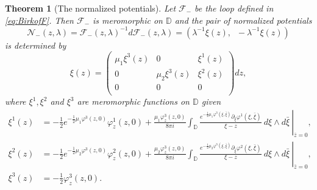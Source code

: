 \documentclass[12pt]{amsart}
\newtheorem{Theorem}{Theorem}[section]
\theoremstyle{definition}
\theoremstyle{remark}
\numberwithin{equation}{section}
\begin{document}
\begin{Theorem}[The normalized potentials]
 Let ${\mathcal F}_{-}$ be the loop defined in \eqref{eq:BirkofF}.
 Then ${\mathcal F}_{-}$ is meromorphic on ${\mathbb D}$ and the pair of normalized potentials 
\begin{equation*}
 {\mathcal N}_{-}(z, {\lambda}) = {\mathcal F}_{-}(z, {\lambda})^{-1} d {\mathcal F}_{-}(z, {\lambda}) 
 = \left({\lambda}^{-1}\xi(z), \;\;-{\lambda}^{-1}\xi(z)\right)
\end{equation*}
 is determined by
\begin{equation}\label{eq:xi}
 \xi(z) =  
 \begin{pmatrix}
  \mu_1 \xi^3(z) & 0 & \xi^1(z) \\
  0 & \mu_2 \xi^3(z) & \xi^2(z) \\
  0 & 0 & 0 \\
 \end{pmatrix} dz,
\end{equation}
 where $\xi^1, \xi^2$ and $\xi^3$ are meromorphic functions on ${\mathbb D}$ given
\begin{align*}
\xi^{1}(z) &=  -\frac{1}{2}e^{-\frac{1}{2} \mu_1 \varphi^3 (z, 0)} 
 \varphi^1_z(z, 0) +\frac{\mu_1 \varphi^3_z(z,0)}{8 \pi i}
 \left.\int_{\mathbb D} \frac{ e^{- \frac{1}{2} \mu_1 \varphi^3(\xi, \bar \xi)}
 \partial_{\bar \xi} \varphi^1(\xi, \bar \xi)}{\xi-z} \> d\xi \wedge d \bar \xi
 \>\right|_{\bar z=0}, \\
\xi^{2}(z) &=  -\frac{1}{2}e^{-\frac{1}{2} \mu_2 \varphi^3 (z, 0)} \varphi^2_z(z, 0)
 +\frac{\mu_2 \varphi^3_z(z,0) }{8 \pi i}
 \left. \int_{\mathbb D} \frac{ e^{- \frac{1}{2} \mu_2 \varphi^3(\xi, \bar \xi)}\partial_{\bar \xi} \varphi^2(\xi, \bar \xi)}{\xi-z} \> d\xi \wedge d \bar \xi
 \>\right|_{\bar z=0}, \\
\xi^3(z) & =- \frac{1}{2} \varphi^3_{z}(z,0).
\end{align*}
\end{Theorem}
\end{document}
